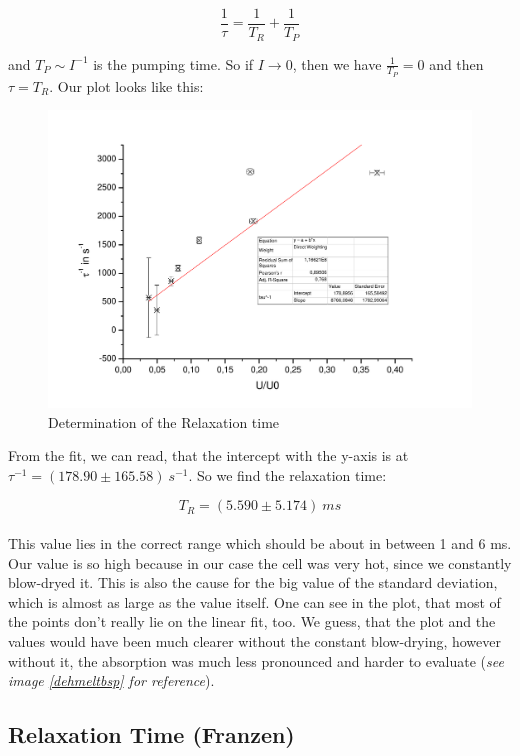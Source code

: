 $$\frac{1}{\tau} = \frac{1}{T_R} + \frac{1}{T_P}$$

and $T_P \sim I^{-1}$ is the pumping time. So if $I \to 0$, then we have $\frac{1}{T_P} = 0$ and then $\tau = T_R$. Our plot looks like this:\\

\begin{figure}[H]
\centering \includegraphics[width=\textwidth]{BilderAusw/Dehmelt.pdf}
\caption{Determination of the Relaxation time}
\end{figure}

From the fit, we can read, that the intercept with the y-axis is at $\tau^{-1} = (178.90 \pm 165.58)\ s^{-1}$. So we find the relaxation time:

$$\boxed{T_R = (5.590 \pm 5.174)\ ms}$$ \\

This value lies in the correct range which should be about in between 1 and 6 ms. Our value is so high because in our case the cell was very hot, since we constantly blow-dryed it. This is also the cause for the big value of the standard deviation, which is almost as large as the value itself. One can see in the plot, that most of the points don't really lie on the linear fit, too. We guess, that the plot and the values would have been much clearer without the constant blow-drying, however without it, the absorption was much less pronounced and harder to evaluate (\emph{see image \ref{dehmeltbsp} for reference}).

\subsection{Relaxation Time (Franzen)}

